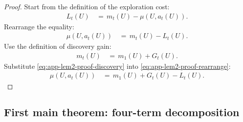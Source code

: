 \documentclass{article} %
\begin{document}
\begin{proof}
Start from the definition of the exploration cost:
\begin{align}
\label{eq:app-lem2-proof-start}
L_t(U)
&\,=\,
m_t(U)-\mu(U,a_t(U)).
\end{align}
Rearrange the equality:
\begin{align}
\label{eq:app-lem2-proof-rearrange}
\mu(U,a_t(U))
&\,=\,
m_t(U)-L_t(U).
\end{align}
Use the definition of discovery gain:
\begin{align}
\label{eq:app-lem2-proof-discovery}
m_t(U)
&\,=\,
m_1(U)+G_t(U).
\end{align}
Substitute \eqref{eq:app-lem2-proof-discovery} into \eqref{eq:app-lem2-proof-rearrange}:
\begin{align}
\label{eq:app-lem2-proof-final}
\mu(U,a_t(U))
&\,=\,
m_1(U)+G_t(U)-L_t(U).
\end{align}
\end{proof}

\subsection{First main theorem: four-term decomposition}
\end{document}
